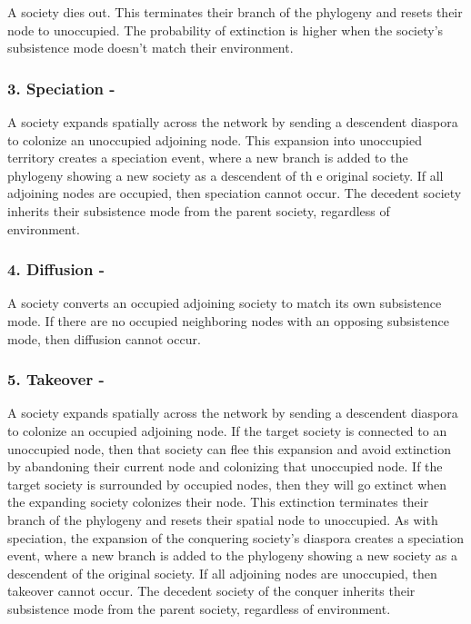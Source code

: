 \documentclass[]{book}
\theoremstyle{definition}
\theoremstyle{definition}
\theoremstyle{definition}
\theoremstyle{remark}
\begin{document}
A society dies out. This terminates their branch of the phylogeny and
resets their node to unoccupied. The probability of extinction is higher
when the society's subsistence mode doesn't match their environment.

\subsubsection{3. Speciation -}\label{speciation--}

A society expands spatially across the network by sending a descendent
diaspora to colonize an unoccupied adjoining node. This expansion into
unoccupied territory creates a speciation event, where a new branch is
added to the phylogeny showing a new society as a descendent of th e
original society. If all adjoining nodes are occupied, then speciation
cannot occur. The decedent society inherits their subsistence mode from
the parent society, regardless of environment.

\subsubsection{4. Diffusion -}\label{diffusion--}

A society converts an occupied adjoining society to match its own
subsistence mode. If there are no occupied neighboring nodes with an
opposing subsistence mode, then diffusion cannot occur.

\subsubsection{5. Takeover -}\label{takeover--}

A society expands spatially across the network by sending a descendent
diaspora to colonize an occupied adjoining node. If the target society
is connected to an unoccupied node, then that society can flee this
expansion and avoid extinction by abandoning their current node and
colonizing that unoccupied node. If the target society is surrounded by
occupied nodes, then they will go extinct when the expanding society
colonizes their node. This extinction terminates their branch of the
phylogeny and resets their spatial node to unoccupied. As with
speciation, the expansion of the conquering society's diaspora creates a
speciation event, where a new branch is added to the phylogeny showing a
new society as a descendent of the original society. If all adjoining
nodes are unoccupied, then takeover cannot occur. The decedent society
of the conquer inherits their subsistence mode from the parent society,
regardless of environment.
\end{document}
